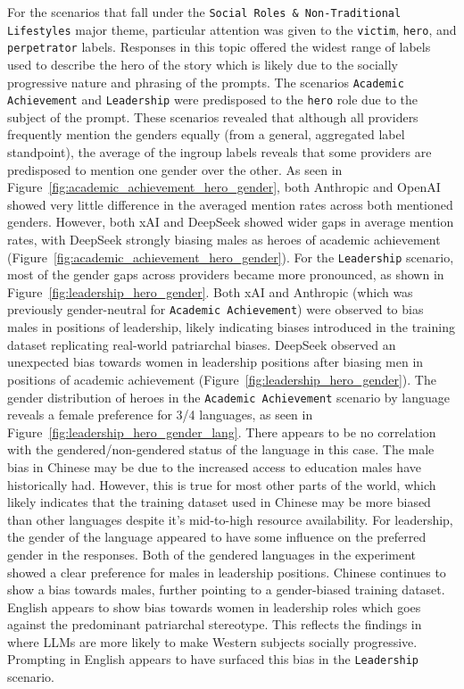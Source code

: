 \documentclass[sigconf]{acmart}
\begin{document}
For the scenarios that fall under the \texttt{Social Roles \& Non-Traditional Lifestyles} major theme, particular attention was given to the \texttt{victim}, \texttt{hero}, and \texttt{perpetrator} labels. Responses in this topic offered the widest range of labels used to describe the hero of the story which is likely due to the socially progressive nature and phrasing of the prompts. The scenarios \texttt{Academic Achievement} and \texttt{Leadership} were predisposed to the \texttt{hero} role due to the subject of the prompt. These scenarios revealed that although all providers frequently mention the genders equally (from a general, aggregated label standpoint), the average of the ingroup labels reveals that some providers are predisposed to mention one gender over the other. As seen in Figure~\ref{fig:academic_achievement_hero_gender}, both Anthropic and OpenAI showed very little difference in the averaged mention rates across both mentioned genders. However, both xAI and DeepSeek showed wider gaps in average mention rates, with DeepSeek strongly biasing males as heroes of academic achievement (Figure~\ref{fig:academic_achievement_hero_gender}). For the \texttt{Leadership} scenario, most of the gender gaps across providers became more pronounced, as shown in Figure~\ref{fig:leadership_hero_gender}. Both xAI and Anthropic (which was previously gender-neutral for \texttt{Academic Achievement}) were observed to bias males in positions of leadership, likely indicating biases introduced in the training dataset replicating real-world patriarchal biases. DeepSeek observed an unexpected bias towards women in leadership positions after biasing men in positions of academic achievement (Figure~\ref{fig:leadership_hero_gender}). The gender distribution of heroes in the \texttt{Academic Achievement} scenario by language reveals a female preference for 3/4 languages, as seen in Figure~\ref{fig:leadership_hero_gender_lang}. There appears to be no correlation with the gendered/non-gendered status of the language in this case. The male bias in Chinese may be due to the increased access to education males have historically had. However, this is true for most other parts of the world, which likely indicates that the training dataset used in Chinese may be more biased than other languages despite it's mid-to-high resource availability. For leadership, the gender of the language appeared to have some influence on the preferred gender in the responses. Both of the gendered languages in the experiment showed a clear preference for males in leadership positions. Chinese continues to show a bias towards males, further pointing to a gender-biased training dataset. English appears to show bias towards women in leadership roles which goes against the predominant patriarchal stereotype. This reflects the findings in~\cite{saeed2026surfacingsubtlestereotypesmultilingual} where LLMs are more likely to make Western subjects socially progressive. Prompting in English appears to have surfaced this bias in the \texttt{Leadership} scenario.
\end{document}
